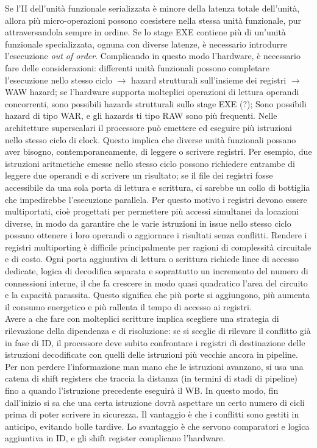 Se l'II dell'unità funzionale serializzata è minore della latenza totale dell'unità, allora più micro-operazioni possono coesistere nella stessa unità funzionale, pur attraversandola sempre in ordine. Se lo stage EXE contiene più di un'unità funzionale specializzata, ognuna con diverse latenze, è necessario introdurre l'esecuzione \textit{out of order}. 
Complicando in questo modo l'hardware, è necessario fare delle considerazioni: differenti unità funzionali possono completare l'esecuzione nello stesso ciclo $\rightarrow$ hazard strutturali sull'insieme dei registri $\rightarrow$ WAW hazard; se l'hardware supporta molteplici operazioni di lettura operandi concorrenti, sono possibili hazards strutturali sullo stage EXE (?); Sono possibili hazard di tipo WAR, e gli hazards ti tipo RAW sono più frequenti. 
Nelle architetture superscalari il processore può emettere ed eseguire più istruzioni nello stesso ciclo di clock. Questo implica che diverse unità funzionali possano aver bisogno, contemporaneamente, di leggere o scrivere registri. Per esempio, due istruzioni aritmetiche emesse nello stesso ciclo possono richiedere entrambe di leggere due operandi e di scrivere un risultato; se il file dei registri fosse accessibile da una sola porta di lettura e scrittura, ci sarebbe un collo di bottiglia che impedirebbe l'esecuzione parallela. Per questo motivo i registri devono essere multiportati, cioè progettati per permettere più accessi simultanei da locazioni diverse, in modo da garantire che le varie istruzioni in issue nello stesso ciclo possano ottenere i loro operandi o aggiornare i risultati senza conflitti. Rendere i registri multiporting è difficile principalmente per ragioni di complessità circuitale e di costo. Ogni porta aggiuntiva di lettura o scrittura richiede linee di accesso dedicate, logica di decodifica separata e soprattutto un incremento del numero di connessioni interne, il che fa crescere in modo quasi quadratico l'area del circuito e la capacità parassita. Questo significa che più porte si aggiungono, più aumenta il consumo energetico e più rallenta il tempo di accesso ai registri.
\\ \noindent Avere a che fare con molteplici scritture implica scegliere una strategia di rilevazione della dipendenza e di risoluzione: se si sceglie di rilevare il conflitto già in fase di ID, il processore deve subito confrontare i registri di destinazione delle istruzioni decodificate con quelli delle istruzioni più vecchie ancora in pipeline. Per non perdere l'informazione man mano che le istruzioni avanzano, si usa una catena di shift registers che traccia la distanza (in termini di stadi di pipeline) fino a quando l'istruzione precedente eseguirà il WB. In questo modo, fin dall'inizio si sa che una certa istruzione dovrà aspettare un certo numero di cicli prima di poter scrivere in sicurezza. Il vantaggio è che i conflitti sono gestiti in anticipo, evitando bolle tardive. Lo svantaggio è che servono comparatori e logica aggiuntiva in ID, e gli shift register complicano l'hardware.
